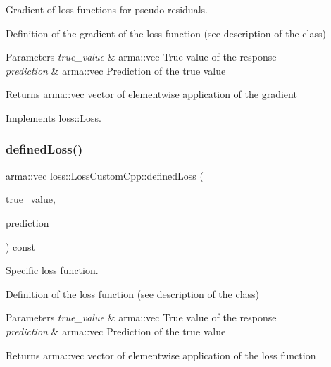 Gradient of loss functions for pseudo residuals. 

Definition of the gradient of the loss function (see description of the class)


\begin{DoxyParams}{Parameters}
{\em true\+\_\+value} & {\ttfamily arma\+::vec} True value of the response \\
\hline
{\em prediction} & {\ttfamily arma\+::vec} Prediction of the true value\\
\hline
\end{DoxyParams}
\begin{DoxyReturn}{Returns}
{\ttfamily arma\+::vec} vector of elementwise application of the gradient 
\end{DoxyReturn}


Implements \mbox{\hyperlink{classloss_1_1_loss_a267a4de70747ade4b2d84ce35a448979}{loss\+::\+Loss}}.

\mbox{\label{classloss_1_1_loss_custom_cpp_abb0c51701c90ce115cd0a0440e5b28f8}} 
\subsubsection{\texorpdfstring{defined\+Loss()}{definedLoss()}}
{\footnotesize\ttfamily arma\+::vec loss\+::\+Loss\+Custom\+Cpp\+::defined\+Loss (\begin{DoxyParamCaption}\item[{const arma\+::vec \&}]{true\+\_\+value,  }\item[{const arma\+::vec \&}]{prediction }\end{DoxyParamCaption}) const\hspace{0.3cm}{\ttfamily [virtual]}}



Specific loss function. 

Definition of the loss function (see description of the class)


\begin{DoxyParams}{Parameters}
{\em true\+\_\+value} & {\ttfamily arma\+::vec} True value of the response \\
\hline
{\em prediction} & {\ttfamily arma\+::vec} Prediction of the true value\\
\hline
\end{DoxyParams}
\begin{DoxyReturn}{Returns}
{\ttfamily arma\+::vec} vector of elementwise application of the loss function 
\end{DoxyReturn}


